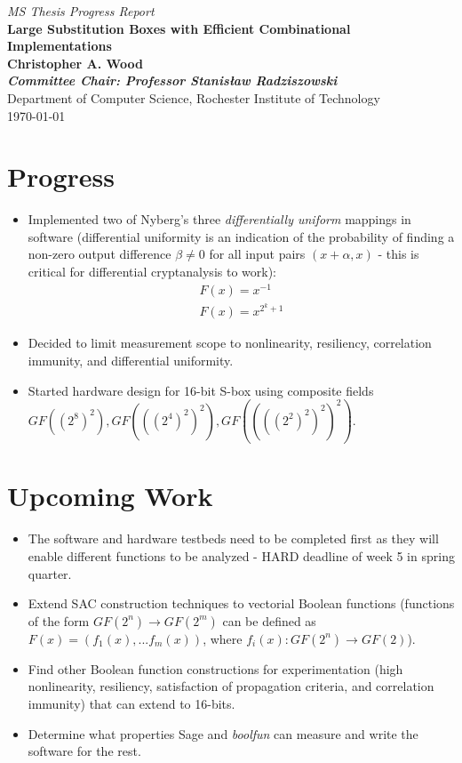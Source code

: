 \documentclass[10pt]{article}
\begin{document}
\thispagestyle{empty} 
\begin{center}
{\em MS Thesis Progress Report}\\
{\large \bf Large Substitution Boxes with Efficient Combinational Implementations}\\
{\bf Christopher A. Wood}\\
{\bf \it Committee Chair: Professor Stanis{\l}aw Radziszowski}\\
Department of Computer Science, Rochester Institute of Technology\\
\today{}\\
\end{center}

\section{Progress}
\begin{itemize}
	\item Implemented two of Nyberg's three \emph{differentially uniform} mappings in software (differential uniformity is an indication of the probability of finding a non-zero output difference $\beta \not= 0$ for all input pairs $(x + \alpha, x)$ - this is critical for differential cryptanalysis to work):
	\begin{align*}
	F(x) = x^{-1} \\
	F(x) = x^{2^{k} + 1}
	\end{align*}
	\item Decided to limit measurement scope to nonlinearity, resiliency,  correlation immunity, and differential uniformity.
	\item Started hardware design for 16-bit S-box using composite fields $GF((2^8)^2), GF(((2^4)^2)^2), GF((((2^2)^2)^2)^2)$.
\end{itemize}

\section{Upcoming Work}
\begin{itemize}
	\item The software and hardware testbeds need to be completed first as they will enable different functions to be analyzed - HARD deadline of week 5 in spring quarter.
	\item Extend SAC construction techniques to vectorial Boolean functions (functions of the form $GF(2^n) \to GF(2^m)$ can be defined as $F(x) = (f_1(x), ... f_m(x))$, where $f_i(x) : GF(2^n) \to GF(2)$). 
	\item Find other Boolean function constructions for experimentation (high nonlinearity, resiliency, satisfaction of propagation criteria, and correlation immunity) that
	can extend to 16-bits.
	\item Determine what properties Sage and \emph{boolfun} can measure and write the software for the rest.
\end{itemize}
\end{document}
